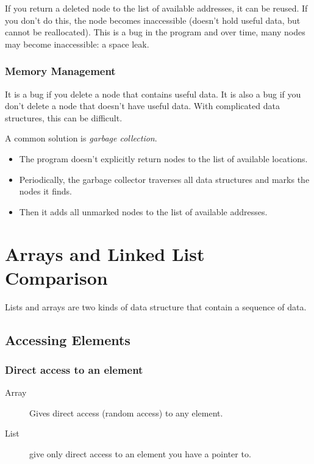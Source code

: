 If you return a deleted node to the list of available addresses, it can be reused.
If you don't do this, the node becomes inaccessible (doesn't hold useful data, but cannot be reallocated).
This is a bug in the program and over time, many nodes may become inaccessible: a space leak.

\subsubsection{Memory Management}\label{ssub:memory_management}

It is a bug if you delete a node that contains useful data.
It is also a bug if you don't delete a node that doesn't have useful data.
With complicated data structures, this can be difficult.

A common solution is \emph{garbage collection}.
\begin{itemize}
	\item The program doesn't explicitly return nodes to the list of available locations.
	\item Periodically, the garbage collector traverses all data structures and marks the nodes it finds.
	\item Then it adds all unmarked nodes to the list of available addresses.
\end{itemize}

\section{Arrays and Linked List Comparison}\label{sec:arrays_and_linked_list_comparison}

Lists and arrays are two kinds of data structure that contain a sequence of data.

\subsection{Accessing Elements}\label{sub:accessing_elements}

\subsubsection{Direct access to an element}\label{ssub:direct_access_to_an_element}

\begin{description}
	\item[Array] Gives direct access (random access) to any element.
	\item[List] give only direct access to an element you have a pointer to.
\end{description}

